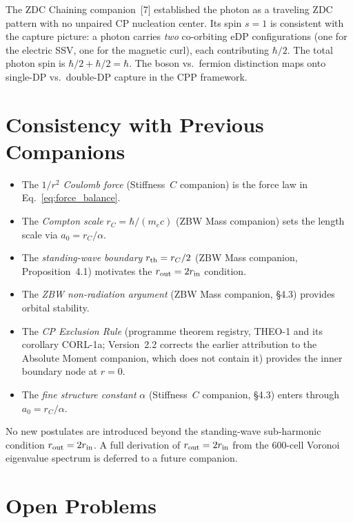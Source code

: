 \documentclass[12pt]{article}
\newcommand{\rC}{r_C}
\newcommand{\rin}{r_{\rm in}}
\newcommand{\rout}{r_{\rm out}}
\newcommand{\aBohr}{a_0}
\begin{document}
The ZDC Chaining companion~[7] established the photon as a traveling
ZDC pattern with no unpaired CP nucleation center.  Its spin $s = 1$
is consistent with the capture picture: a photon carries \emph{two}
co-orbiting eDP configurations (one for the electric SSV, one for the
magnetic curl), each contributing $\hbar/2$.  The total photon spin
is $\hbar/2 + \hbar/2 = \hbar$.  The boson vs.\ fermion distinction
maps onto single-DP vs.\ double-DP capture in the CPP framework.

\section{Consistency with Previous Companions}
\label{sec:consistency}

\begin{itemize}[noitemsep]
  \item The \emph{$1/r^2$ Coulomb force} (Stiffness~$C$ companion)
    is the force law in Eq.~\eqref{eq:force_balance}.
  \item The \emph{Compton scale} $\rC = \hbar/(m_e c)$ (ZBW Mass
    companion) sets the length scale via $\aBohr = \rC/\alpha$.
  \item The \emph{standing-wave boundary} $r_{\rm th} = \rC/2$ (ZBW
    Mass companion, Proposition~4.1) motivates the $\rout = 2\rin$
    condition.
  \item The \emph{ZBW non-radiation argument} (ZBW Mass companion,
    \S4.3) provides orbital stability.
  \item The \emph{CP Exclusion Rule} (programme theorem registry, THEO-1 and
    its corollary CORL-1a; Version~2.2 corrects the earlier attribution to the
    Absolute Moment companion, which does not contain it) provides the inner
    boundary node at $r = 0$.
  \item The \emph{fine structure constant} $\alpha$ (Stiffness~$C$
    companion, \S4.3) enters through $\aBohr = \rC/\alpha$.
\end{itemize}

No new postulates are introduced beyond the standing-wave sub-harmonic
condition $\rout = 2\rin$.  A full derivation of $\rout = 2\rin$ from
the 600-cell Voronoi eigenvalue spectrum is deferred to a future
companion.

\section{Open Problems}
\label{sec:open}
\end{document}
